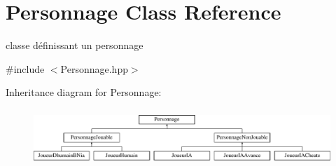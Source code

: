 \hypertarget{classPersonnage}{\section{Personnage Class Reference}
\label{classPersonnage}
}


classe définissant un personnage  




{\ttfamily \#include $<$Personnage.\-hpp$>$}

Inheritance diagram for Personnage\-:\begin{figure}[H]
\begin{center}
\leavevmode
\includegraphics[height=2.153846cm]{classPersonnage}
\end{center}
\end{figure}
